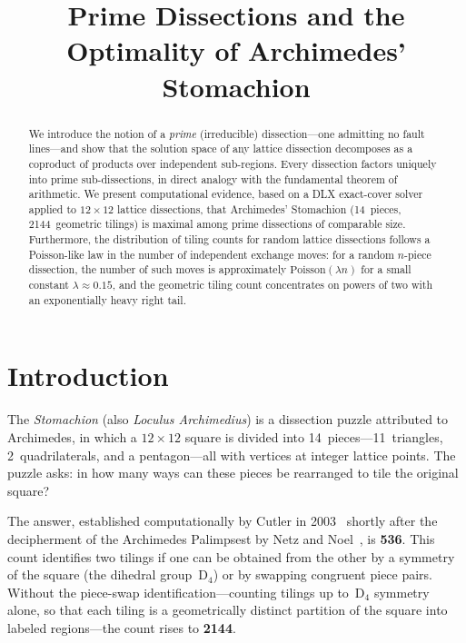 \documentclass[12pt]{article}
\title{Prime Dissections and the Optimality of Archimedes' Stomachion}
\author{}
\date{}
\theoremstyle{definition}
\theoremstyle{remark}
\newcommand{\D}{\mathrm{D}}
\begin{document}
\maketitle

\begin{abstract}
We introduce the notion of a \emph{prime} (irreducible) dissection---one
admitting no fault lines---and show that the solution space of any lattice
dissection decomposes as a coproduct of products over independent
sub-regions. Every dissection factors uniquely into prime sub-dissections,
in direct analogy with the fundamental theorem of arithmetic. We present
computational evidence, based on a DLX exact-cover solver applied to
$12 \times 12$ lattice dissections, that Archimedes' Stomachion (14~pieces,
2144~geometric tilings) is maximal among prime dissections of comparable
size. Furthermore, the distribution of tiling counts for random lattice
dissections follows a Poisson-like law in the number of independent exchange
moves: for a random $n$-piece dissection, the number of such moves is
approximately $\mathrm{Poisson}(\lambda n)$ for a small constant
$\lambda \approx 0.15$, and the geometric tiling count concentrates on
powers of two with an exponentially heavy right tail.
\end{abstract}

\section{Introduction}

The \emph{Stomachion} (also \emph{Loculus Archimedius}) is a dissection
puzzle attributed to Archimedes, in which a $12 \times 12$ square is
divided into 14~pieces---11~triangles, 2~quadrilaterals, and a
pentagon---all with vertices at integer lattice points. The puzzle asks:
in how many ways can these pieces be rearranged to tile the original square?

The answer, established computationally by Cutler in 2003~\cite{Cutler2003}
shortly after the decipherment of the Archimedes Palimpsest by Netz and
Noel~\cite{Netz2004}, is \textbf{536}. This count identifies two tilings
if one can be obtained from the other by a symmetry of the square (the
dihedral group~$\D_4$) or by swapping congruent piece pairs. Without the
piece-swap identification---counting tilings up to~$\D_4$ symmetry alone,
so that each tiling is a geometrically distinct partition of the square
into labeled regions---the count rises to \textbf{2144}.
\end{document}
